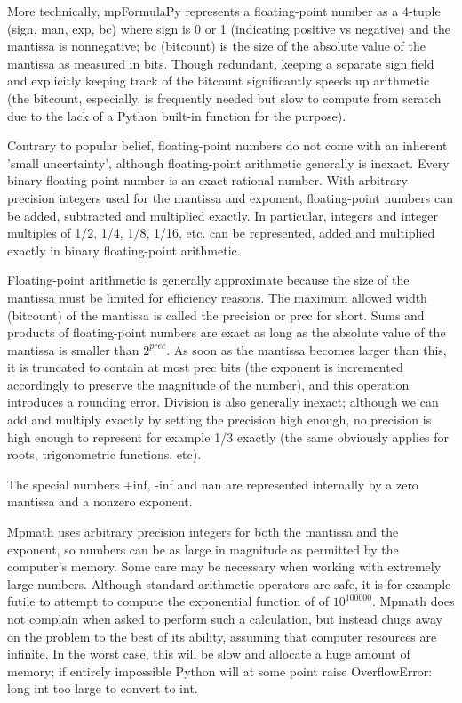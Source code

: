 \vpara
More technically, mpFormulaPy represents a floating-point number as a 4-tuple (sign, man, exp, bc) where sign is 0 or 1 (indicating positive vs negative) and the mantissa is nonnegative; bc (bitcount) is the size of the absolute value of the mantissa as measured in bits. Though
redundant, keeping a separate sign field and explicitly keeping track of the bitcount significantly speeds up arithmetic (the bitcount, especially, is frequently needed but slow to compute from scratch due to the lack of a Python built-in function for the purpose).

\vpara
Contrary to popular belief, floating-point numbers do not come with an inherent 'small uncertainty', although floating-point arithmetic generally is inexact. Every binary floating-point number is an exact rational number. With arbitrary-precision integers used for the mantissa and exponent, floating-point numbers can be added, subtracted and multiplied exactly. In particular, integers and integer multiples of 1/2, 1/4, 1/8, 1/16, etc. can be represented, added and multiplied exactly in binary floating-point arithmetic.

\vpara
Floating-point arithmetic is generally approximate because the size of the mantissa must be limited for efficiency reasons. The maximum allowed width (bitcount) of the mantissa is called the precision or prec for short. Sums and products of floating-point numbers are exact
as long as the absolute value of the mantissa is smaller than $2^{prec}$. As soon as the mantissa becomes larger than this, it is truncated to contain at most prec bits (the exponent is incremented accordingly to preserve the magnitude of the number), and this operation introduces a rounding error. Division is also generally inexact; although we can add and
multiply exactly by setting the precision high enough, no precision is high enough to represent for example 1/3 exactly (the same obviously applies for roots, trigonometric functions, etc).

\vpara
The special numbers +inf, -inf and nan are represented internally by a zero mantissa and a nonzero exponent.

\vpara
Mpmath uses arbitrary precision integers for both the mantissa and the exponent, so numbers can be as large in magnitude as permitted by the computer's memory. Some care may be necessary when working with extremely large numbers. Although standard arithmetic operators are safe, it is for example futile to attempt to compute the exponential
function of of $10^{100000}$. Mpmath does not complain when asked to perform such a calculation, but instead chugs away on the problem to the best of its ability, assuming that computer resources are infinite. In the worst case, this will be slow and allocate a huge amount of memory; if entirely impossible Python will at some point raise OverflowError: long int too large to convert to int.

